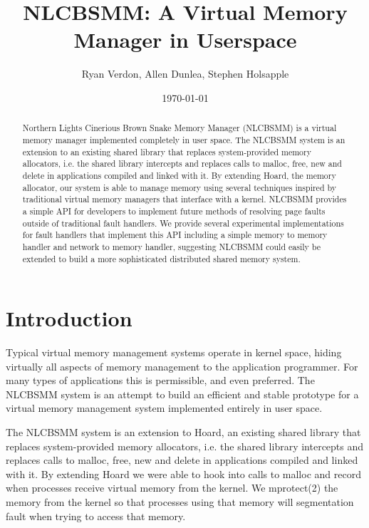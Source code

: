 \documentclass[9pt]{sig-alternate-10pt}
\begin{document}
\title{\vfill NLCBSMM: A Virtual Memory Manager in Userspace} 
\author{Ryan Verdon, Allen Dunlea, Stephen Holsapple}
\date{\today}
\maketitle

\begin{abstract}
Northern Lights Cinerious Brown Snake Memory Manager (NLCBSMM) is a virtual memory manager implemented completely in user space.  The NLCBSMM system is an extension to an existing shared library that replaces system-provided memory allocators, i.e. the shared library intercepts and replaces calls to malloc, free, new and delete in applications compiled and linked with it.  By extending Hoard, the memory allocator, our system is able to manage memory using several techniques inspired by traditional virtual memory managers that interface with a kernel.  NLCBSMM provides a simple API for developers to implement future methods of resolving page faults outside of traditional fault handlers.  We provide several experimental implementations for fault handlers that implement this API including a simple memory to memory handler and network to memory handler, suggesting NLCBSMM could easily be extended to build a more sophisticated distributed shared memory system.
\end{abstract}

\section{Introduction}
Typical virtual memory management systems operate in kernel space, hiding virtually all aspects of memory management to the application programmer.  For many types of applications this is permissible, and even preferred.  The NLCBSMM system is an attempt to build an efficient and stable prototype for a virtual memory management system implemented entirely in user space.

The NLCBSMM system is an extension to Hoard, an existing shared library that replaces system-provided memory allocators, i.e. the shared library intercepts and replaces calls to malloc, free, new and delete in applications compiled and linked with it. By extending Hoard we were able to hook into calls to malloc and record when processes receive virtual memory from the kernel. We mprotect(2) the memory from the kernel so that processes using that memory will segmentation fault when trying to access that memory. 
\end{document}
